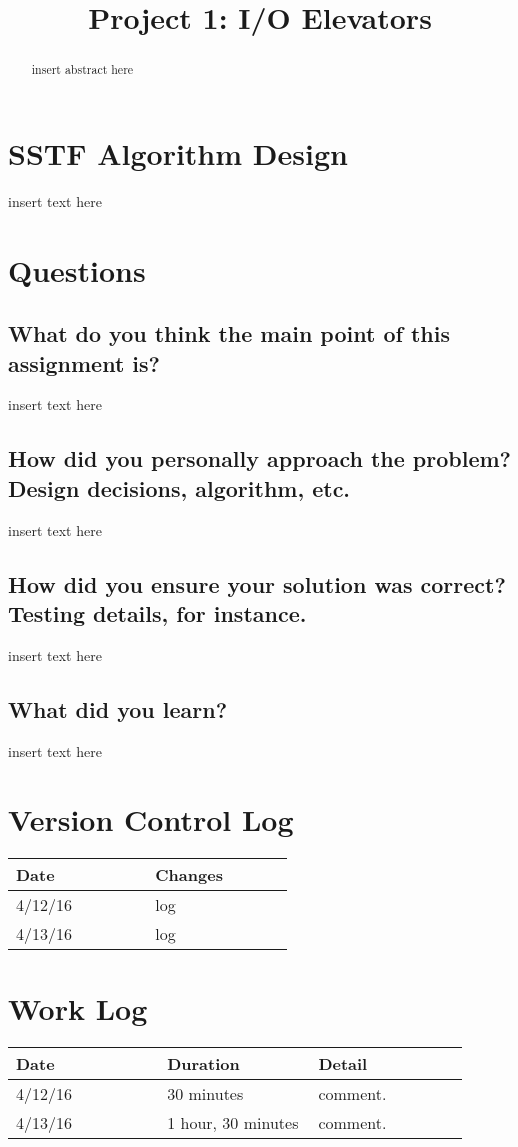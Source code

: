 \documentclass[letterpaper,10pt,draftclsnofoot,onecolumn]{IEEEtran}
\begin{document}
\title{Project 1: I/O Elevators}

\author{
}

\maketitle
\begin{abstract}
insert abstract here
\end{abstract}
\pagebreak

\section{SSTF Algorithm Design}
insert text here

\section{Questions}
\subsection{What do you think the main point of this assignment is?}
insert text here

\subsection{How did you personally approach the problem? Design decisions, algorithm, etc.}
insert text here

\subsection{How did you ensure your solution was correct? Testing details, for instance.}
insert text here

\subsection{What did you learn?}
insert text here

\section{Version Control Log}
\begin{tabular}{|p{0.3\linewidth}|p{0.3\linewidth}|}
\hline
\textbf{Date}&\textbf{Changes}\\
\hline
4/12/16 & log \\
\hline
4/13/16 & log \\
\end{tabular}

\section{Work Log}
\begin{tabular}{|p{0.3\linewidth}|p{0.3\linewidth}|p{0.3\linewidth}|}
\hline
\textbf{Date}&\textbf{Duration}&\textbf{Detail}\\
\hline
4/12/16 & 30 minutes & comment. \\
\hline
4/13/16 & 1 hour, 30 minutes & comment. \\

\end{tabular}
\end{document}
